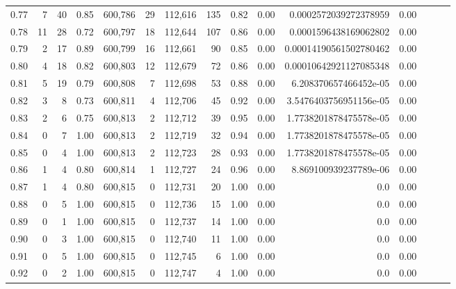\begin{tabular}{rrrrrrrrrrrrrrr}
0.77 &       7 &     40 &  0.85 &  600,786 &       29 &  112,616 &      135 &  0.82 &  0.00 &   0.0002572039272378959 &      0.00 \\
0.78 &      11 &     28 &  0.72 &  600,797 &       18 &  112,644 &      107 &  0.86 &  0.00 &   0.0001596438169062802 &      0.00 \\
0.79 &       2 &     17 &  0.89 &  600,799 &       16 &  112,661 &       90 &  0.85 &  0.00 &  0.00014190561502780462 &      0.00 \\
0.80 &       4 &     18 &  0.82 &  600,803 &       12 &  112,679 &       72 &  0.86 &  0.00 &  0.00010642921127085348 &      0.00 \\
0.81 &       5 &     19 &  0.79 &  600,808 &        7 &  112,698 &       53 &  0.88 &  0.00 &   6.208370657466452e-05 &      0.00 \\
0.82 &       3 &      8 &  0.73 &  600,811 &        4 &  112,706 &       45 &  0.92 &  0.00 &  3.5476403756951156e-05 &      0.00 \\
0.83 &       2 &      6 &  0.75 &  600,813 &        2 &  112,712 &       39 &  0.95 &  0.00 &  1.7738201878475578e-05 &      0.00 \\
0.84 &       0 &      7 &  1.00 &  600,813 &        2 &  112,719 &       32 &  0.94 &  0.00 &  1.7738201878475578e-05 &      0.00 \\
0.85 &       0 &      4 &  1.00 &  600,813 &        2 &  112,723 &       28 &  0.93 &  0.00 &  1.7738201878475578e-05 &      0.00 \\
0.86 &       1 &      4 &  0.80 &  600,814 &        1 &  112,727 &       24 &  0.96 &  0.00 &   8.869100939237789e-06 &      0.00 \\
0.87 &       1 &      4 &  0.80 &  600,815 &        0 &  112,731 &       20 &  1.00 &  0.00 &                     0.0 &      0.00 \\
0.88 &       0 &      5 &  1.00 &  600,815 &        0 &  112,736 &       15 &  1.00 &  0.00 &                     0.0 &      0.00 \\
0.89 &       0 &      1 &  1.00 &  600,815 &        0 &  112,737 &       14 &  1.00 &  0.00 &                     0.0 &      0.00 \\
0.90 &       0 &      3 &  1.00 &  600,815 &        0 &  112,740 &       11 &  1.00 &  0.00 &                     0.0 &      0.00 \\
0.91 &       0 &      5 &  1.00 &  600,815 &        0 &  112,745 &        6 &  1.00 &  0.00 &                     0.0 &      0.00 \\
0.92 &       0 &      2 &  1.00 &  600,815 &        0 &  112,747 &        4 &  1.00 &  0.00 &                     0.0 &      0.00 \\

\end{tabular}
